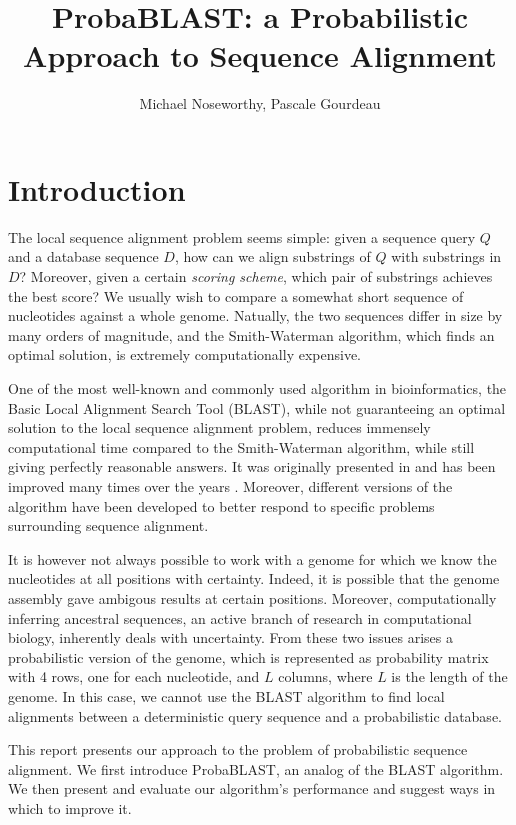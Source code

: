 \documentclass[12pt]{article}%
\begin{document}
\title{ProbaBLAST: a Probabilistic Approach to Sequence Alignment}
\author{Michael Noseworthy, Pascale Gourdeau}
\date{}
\maketitle

\section{Introduction}

The local sequence alignment problem seems simple: given a sequence query $Q$ and a database sequence $D$, how can we align substrings of $Q$ with substrings in $D$? Moreover, given a certain \emph{scoring scheme}, which pair of substrings achieves the best score? We usually wish to compare a somewhat short sequence of nucleotides against a whole genome. Natually, the two sequences differ in size by many orders of magnitude, and the Smith-Waterman algorithm, which finds an optimal solution, is extremely computationally expensive. 

One of the most well-known and commonly used algorithm in bioinformatics, the Basic Local Alignment Search Tool (BLAST), while not guaranteeing an optimal solution to the local sequence alignment problem, reduces immensely computational time compared to the Smith-Waterman algorithm, while still giving perfectly reasonable answers. It was originally presented in \cite{originalBLAST} and has been improved many times over the years \cite{blast2}. Moreover, different versions of the algorithm have been developed to better respond to specific problems surrounding sequence alignment. 

It is however not always possible to work with a genome for which we know the nucleotides at all positions with certainty. Indeed, it is possible that the genome assembly gave ambigous results at certain positions. Moreover, computationally inferring ancestral sequences, an active branch of research in computational biology, inherently deals with uncertainty. From these two issues arises a probabilistic version of the genome, which is represented as probability matrix with 4 rows, one for each nucleotide, and $L$ columns, where $L$ is the length of the genome. In this case, we cannot use the BLAST algorithm to find local alignments between a deterministic query sequence and a probabilistic database.

This report presents our approach to the problem of probabilistic sequence alignment. 
We first introduce ProbaBLAST, an analog of the BLAST algorithm. We then present and evaluate our algorithm's performance and suggest ways in which to improve it.
\end{document}

